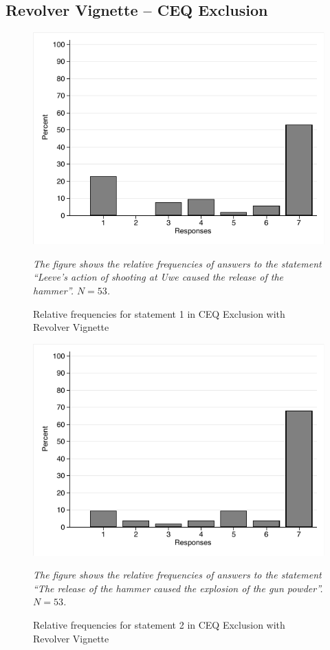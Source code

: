 \documentclass[egregdoesnotlikesansseriftitles,12pt]{scrartcl}
\begin{document}
\subsection{Revolver Vignette -- CEQ Exclusion}
\begin{figure}[H]
   \centering
   \includegraphics[scale=0.8]{figures/rev_ceq_hist_1.pdf}
   \begin{minipage}{0.9\linewidth}
   \footnotesize
   \emph{The figure shows the relative frequencies of answers to the statement ``Leeve's action of shooting at Uwe caused the release of the hammer''. $N=53$.}
   \end{minipage}
   \caption{Relative frequencies for statement 1 in CEQ Exclusion with Revolver Vignette}
   \label{fig:rev_ceq_hist_1}
\end{figure}

\begin{figure}[H]
   \centering
   \includegraphics[scale=0.8]{figures/rev_ceq_hist_2.pdf}
   \begin{minipage}{0.9\linewidth}
   \footnotesize
   \emph{The figure shows the relative frequencies of answers to the statement ``The release of the hammer caused the explosion of the gun powder''. $N=53$.}
   \end{minipage}
   \caption{Relative frequencies for statement 2 in CEQ Exclusion with Revolver Vignette}
   \label{fig:rev_ceq_hist_2}
\end{figure}
\end{document}
